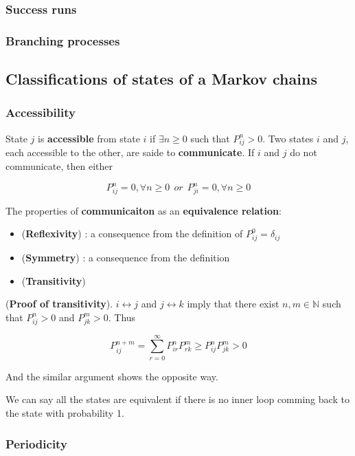 \documentclass[12pt]{article}
\theoremstyle{nonumberbreak}
\begin{document}
\subsubsection*{Success runs}

\subsubsection*{Branching processes}



\subsection{Classifications of states of a Markov chains}


\subsubsection*{Accessibility}

State $j$ is \textbf{accessible} from state $i$ if $\exists n \ge 0$ such that $P^n_{ij} > 0$. Two states $i$ and $j$, each accessible to the other, are saide to \textbf{communicate}. If $i$ and $j$ do not communicate, then either

$$
P^n_{ij} = 0, \forall n \ge 0 \ \ or \ \ P^n_{ji} = 0, \forall n \ge 0 
$$

The properties of \textbf{communicaiton} as an \textbf{equivalence relation}:

\begin{itemize}
	\item (\textbf{Reflexivity}) : a consequence from the definition of $P^0_{ij} = \delta_{ij}$
	\item (\textbf{Symmetry}) : a consequence from the definition
	\item (\textbf{Transitivity})
\end{itemize}

(\textbf{Proof of transitivity}). $i \leftrightarrow j$ and $j \leftrightarrow k$ imply that there exist $n,m \in \mathbb{N}$ such that $P_{ij}^n >0$ and $P_{jk}^m >0$. Thus 

$$
P_{ij}^{n+m} = \sum_{r=0}^\infty P_{ir}^n P_{rk}^m \ge P_{ij}^n P_{jk}^m > 0
$$

And the similar argument shows the opposite way. 

We can say all the states are equivalent if there is no inner loop comming back to the state with probability 1. 


\subsubsection*{Periodicity}
\end{document}
